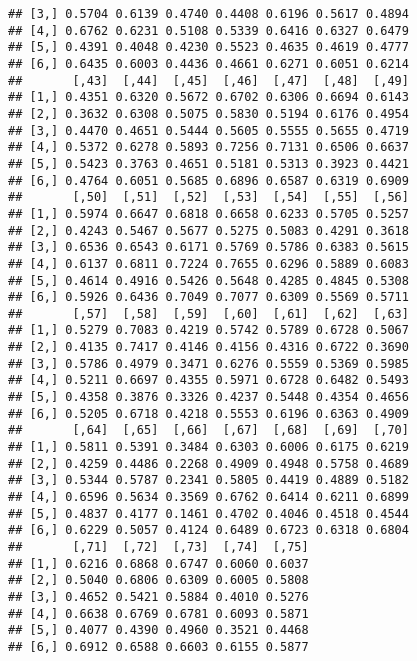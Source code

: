 \documentclass[12pt,letterpaper,english]{article}\usepackage[]{graphicx}\usepackage[]{color}
\makeatletter
\newenvironment{kframe}{%
 \def\at@end@of@kframe{}%
 \ifinner\ifhmode%
  \def\at@end@of@kframe{\end{minipage}}%
  \begin{minipage}{\columnwidth}%
 \fi\fi%
 \def\FrameCommand##1{\hskip\@totalleftmargin \hskip-\fboxsep
 \colorbox{shadecolor}{##1}\hskip-\fboxsep
     \hskip-\linewidth \hskip-\@totalleftmargin \hskip\columnwidth}%
 \MakeFramed {\advance\hsize-\width
   \@totalleftmargin\z@ \linewidth\hsize
   \@setminipage}}%
 {\par\unskip\endMakeFramed%
 \at@end@of@kframe}
\newenvironment{knitrout}{}{} %
\makeatother
\begin{document}
\begin{knitrout}
\begin{kframe}
\begin{verbatim}
## [3,] 0.5704 0.6139 0.4740 0.4408 0.6196 0.5617 0.4894
## [4,] 0.6762 0.6231 0.5108 0.5339 0.6416 0.6327 0.6479
## [5,] 0.4391 0.4048 0.4230 0.5523 0.4635 0.4619 0.4777
## [6,] 0.6435 0.6003 0.4436 0.4661 0.6271 0.6051 0.6214
##       [,43]  [,44]  [,45]  [,46]  [,47]  [,48]  [,49]
## [1,] 0.4351 0.6320 0.5672 0.6702 0.6306 0.6694 0.6143
## [2,] 0.3632 0.6308 0.5075 0.5830 0.5194 0.6176 0.4954
## [3,] 0.4470 0.4651 0.5444 0.5605 0.5555 0.5655 0.4719
## [4,] 0.5372 0.6278 0.5893 0.7256 0.7131 0.6506 0.6637
## [5,] 0.5423 0.3763 0.4651 0.5181 0.5313 0.3923 0.4421
## [6,] 0.4764 0.6051 0.5685 0.6896 0.6587 0.6319 0.6909
##       [,50]  [,51]  [,52]  [,53]  [,54]  [,55]  [,56]
## [1,] 0.5974 0.6647 0.6818 0.6658 0.6233 0.5705 0.5257
## [2,] 0.4243 0.5467 0.5677 0.5275 0.5083 0.4291 0.3618
## [3,] 0.6536 0.6543 0.6171 0.5769 0.5786 0.6383 0.5615
## [4,] 0.6137 0.6811 0.7224 0.7655 0.6296 0.5889 0.6083
## [5,] 0.4614 0.4916 0.5426 0.5648 0.4285 0.4845 0.5308
## [6,] 0.5926 0.6436 0.7049 0.7077 0.6309 0.5569 0.5711
##       [,57]  [,58]  [,59]  [,60]  [,61]  [,62]  [,63]
## [1,] 0.5279 0.7083 0.4219 0.5742 0.5789 0.6728 0.5067
## [2,] 0.4135 0.7417 0.4146 0.4156 0.4316 0.6722 0.3690
## [3,] 0.5786 0.4979 0.3471 0.6276 0.5559 0.5369 0.5985
## [4,] 0.5211 0.6697 0.4355 0.5971 0.6728 0.6482 0.5493
## [5,] 0.4358 0.3876 0.3326 0.4237 0.5448 0.4354 0.4656
## [6,] 0.5205 0.6718 0.4218 0.5553 0.6196 0.6363 0.4909
##       [,64]  [,65]  [,66]  [,67]  [,68]  [,69]  [,70]
## [1,] 0.5811 0.5391 0.3484 0.6303 0.6006 0.6175 0.6219
## [2,] 0.4259 0.4486 0.2268 0.4909 0.4948 0.5758 0.4689
## [3,] 0.5344 0.5787 0.2341 0.5805 0.4419 0.4889 0.5182
## [4,] 0.6596 0.5634 0.3569 0.6762 0.6414 0.6211 0.6899
## [5,] 0.4837 0.4177 0.1461 0.4702 0.4046 0.4518 0.4544
## [6,] 0.6229 0.5057 0.4124 0.6489 0.6723 0.6318 0.6804
##       [,71]  [,72]  [,73]  [,74]  [,75]
## [1,] 0.6216 0.6868 0.6747 0.6060 0.6037
## [2,] 0.5040 0.6806 0.6309 0.6005 0.5808
## [3,] 0.4652 0.5421 0.5884 0.4010 0.5276
## [4,] 0.6638 0.6769 0.6781 0.6093 0.5871
## [5,] 0.4077 0.4390 0.4960 0.3521 0.4468
## [6,] 0.6912 0.6588 0.6603 0.6155 0.5877
\end{verbatim}
\end{kframe}
\end{knitrout}
\end{document}
